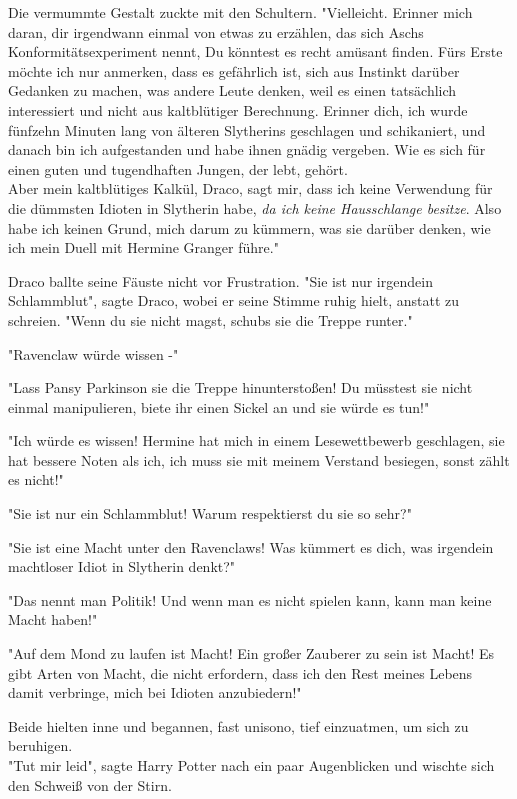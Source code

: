 {Die vermummte Gestalt zuckte mit den Schultern. "Vielleicht. Erinner mich daran, dir irgendwann einmal von etwas zu erzählen, das sich Aschs Konformitätsexperiment nennt, Du könntest es recht amüsant finden. Fürs Erste möchte ich nur anmerken, dass es gefährlich ist, sich aus Instinkt darüber Gedanken zu machen, was andere Leute denken, weil es einen tatsächlich interessiert und nicht aus kaltblütiger Berechnung. Erinner dich, ich wurde fünfzehn Minuten lang von älteren Slytherins geschlagen und schikaniert, und danach bin ich aufgestanden und habe ihnen gnädig vergeben. Wie es sich für einen guten und tugendhaften Jungen, der lebt, gehört.\\ Aber mein kaltblütiges Kalkül, Draco, sagt mir, dass ich keine Verwendung für die dümmsten Idioten in Slytherin habe, \emph{da ich keine Hausschlange besitze}. Also habe ich keinen Grund, mich darum zu kümmern, was sie darüber denken, wie ich mein Duell mit Hermine Granger führe."

Draco ballte seine Fäuste nicht vor Frustration. "Sie ist nur irgendein Schlammblut", sagte Draco, wobei er seine Stimme ruhig hielt, anstatt zu schreien. "Wenn du sie nicht magst, schubs sie die Treppe runter."

"Ravenclaw würde wissen -"

"Lass Pansy Parkinson sie die Treppe hinunterstoßen! Du müsstest sie nicht einmal manipulieren, biete ihr einen Sickel an und sie würde es tun!"

"Ich würde es wissen! Hermine hat mich in einem Lesewettbewerb geschlagen, sie hat bessere Noten als ich, ich muss sie mit meinem Verstand besiegen, sonst zählt es nicht!"

"Sie ist nur ein Schlammblut! Warum respektierst du sie so sehr?"

"Sie ist eine Macht unter den Ravenclaws! Was kümmert es dich, was irgendein machtloser Idiot in Slytherin denkt?"

"Das nennt man Politik! Und wenn man es nicht spielen kann, kann man keine Macht haben!"

"Auf dem Mond zu laufen ist Macht! Ein großer Zauberer zu sein ist Macht! Es gibt Arten von Macht, die nicht erfordern, dass ich den Rest meines Lebens damit verbringe, mich bei Idioten anzubiedern!"

Beide hielten inne und begannen, fast unisono, tief einzuatmen, um sich zu beruhigen.\\ "Tut mir leid", sagte Harry Potter nach ein paar Augenblicken und wischte sich den Schweiß von der Stirn.

}
